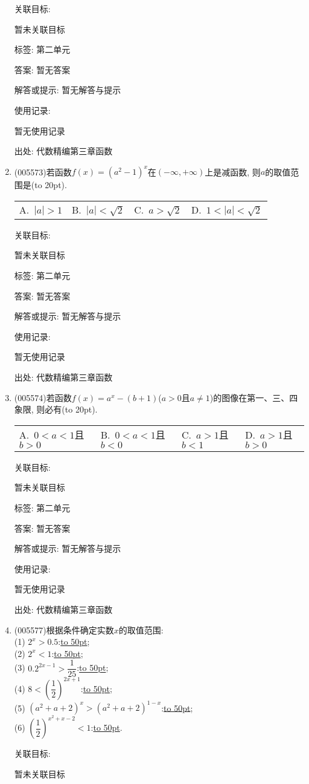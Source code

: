 \documentclass[10pt,a4paper]{article}
\newcommand{\blank}[1]{\underline{\hbox to #1pt{}}}
\newcommand{\bracket}[1]{(\hbox to #1pt{})}
\newcommand{\fourch}[4]{\par\begin{tabular}{p{.23\textwidth}p{.23\textwidth}p{.23\textwidth}p{.23\textwidth}}
A.~#1 &B.~#2& C.~#3& D.~#4
\end{tabular}}
\begin{document}
\begin{enumerate}[1.]
关联目标:

暂未关联目标



标签: 第二单元

答案: 暂无答案

解答或提示: 暂无解答与提示

使用记录:

暂无使用记录


出处: 代数精编第三章函数
\item { (005573)}若函数$f(x)=(a^2-1)^x$在$(-\infty ,+\infty)$上是减函数, 则$a$的取值范围是\bracket{20}.
\fourch{$|a|>1$}{$|a|<\sqrt 2$}{$a>\sqrt 2$}{$1<|a|<\sqrt 2$}


关联目标:

暂未关联目标



标签: 第二单元

答案: 暂无答案

解答或提示: 暂无解答与提示

使用记录:

暂无使用记录


出处: 代数精编第三章函数
\item { (005574)}若函数$f(x)=a^x-(b+1)$($a>0$且$a\ne 1$)的图像在第一、三、四象限, 则必有\bracket{20}.
\fourch{$0<a<1$且$b>0$}{$0<a<1$且$b<0$}{$a>1$且$b<1$}{$a>1$且$b>0$}


关联目标:

暂未关联目标



标签: 第二单元

答案: 暂无答案

解答或提示: 暂无解答与提示

使用记录:

暂无使用记录


出处: 代数精编第三章函数
\item { (005577)}根据条件确定实数$x$的取值范围:\\
(1) $2^x>0.5$:\blank{50};\\
(2) $2^x<1$:\blank{50};\\
(3) $0.2^{2x-1}>\dfrac 1{25}$:\blank{50};\\
(4) $8<(\dfrac 12)^{2x+1}$:\blank{50};\\
(5) $(a^2+a+2)^x>(a^2+a+2)^{1-x}$:\blank{50};\\
(6) $(\dfrac 12)^{x^2+x-2}<1$:\blank{50}.


关联目标:

暂未关联目标




\end{enumerate}
\end{document}
